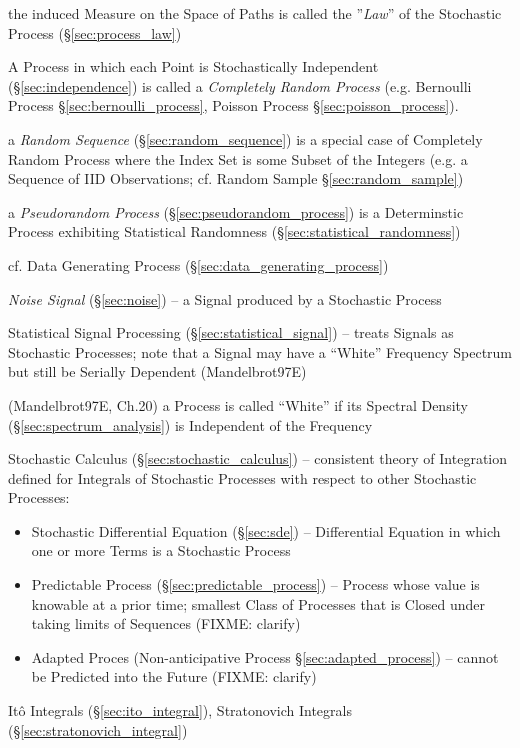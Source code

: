 the induced Measure on the Space of Paths is called the ''\emph{Law}'' of the
Stochastic Process (\S\ref{sec:process_law})

A Process in which each Point is Stochastically Independent
(\S\ref{sec:independence}) is called a \emph{Completely Random Process} (e.g.
Bernoulli Process \S\ref{sec:bernoulli_process}, Poisson Process
\S\ref{sec:poisson_process}).

\fist a \emph{Random Sequence} (\S\ref{sec:random_sequence}) is a special case
of Completely Random Process where the Index Set is some Subset of the Integers
(e.g. a Sequence of IID Observations; cf. Random Sample
\S\ref{sec:random_sample})

\fist a \emph{Pseudorandom Process} (\S\ref{sec:pseudorandom_process}) is a
Determinstic Process exhibiting Statistical Randomness
(\S\ref{sec:statistical_randomness})

\fist cf. Data Generating Process (\S\ref{sec:data_generating_process})

\fist \emph{Noise Signal} (\S\ref{sec:noise}) -- a Signal produced by a
Stochastic Process

\fist Statistical Signal Processing (\S\ref{sec:statistical_signal}) -- treats
Signals as Stochastic Processes;
note that a Signal may have a ``White'' Frequency Spectrum but still be Serially
Dependent (Mandelbrot97E)

(Mandelbrot97E, Ch.20) a Process is called ``White'' if its Spectral Density
(\S\ref{sec:spectrum_analysis}) is Independent of the Frequency

\fist Stochastic Calculus (\S\ref{sec:stochastic_calculus}) -- consistent theory
of Integration defined for Integrals of Stochastic Processes with respect to
other Stochastic Processes:
\begin{itemize}
  \item Stochastic Differential Equation (\S\ref{sec:sde}) -- Differential
    Equation in which one or more Terms is a Stochastic Process
  \item Predictable Process (\S\ref{sec:predictable_process}) -- Process whose
    value is knowable at a prior time; smallest Class of Processes that is
    Closed under taking limits of Sequences (FIXME: clarify)
  \item Adapted Proces (Non-anticipative Process \S\ref{sec:adapted_process}) --
    cannot be Predicted into the Future (FIXME: clarify)
\end{itemize}
It\^o Integrals (\S\ref{sec:ito_integral}), Stratonovich Integrals
(\S\ref{sec:stratonovich_integral})

